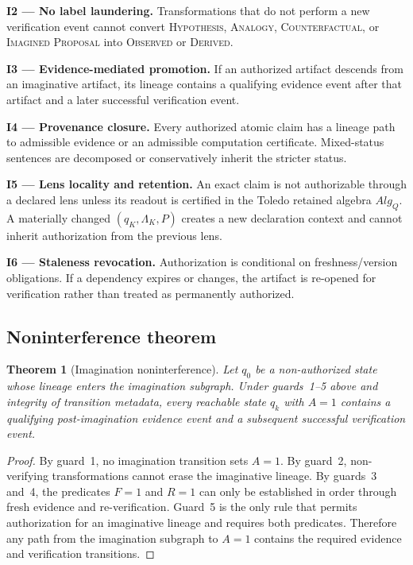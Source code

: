 \documentclass[10pt,twocolumn]{article}
\newtheorem{theorem}{Theorem}
\begin{document}
\textbf{I2 --- No label laundering.} Transformations that do not perform a new verification event cannot convert \textsc{Hypothesis}, \textsc{Analogy}, \textsc{Counterfactual}, or \textsc{Imagined Proposal} into \textsc{Observed} or \textsc{Derived}.

\textbf{I3 --- Evidence-mediated promotion.} If an authorized artifact descends from an imaginative artifact, its lineage contains a qualifying evidence event after that artifact and a later successful verification event.

\textbf{I4 --- Provenance closure.} Every authorized atomic claim has a lineage path to admissible evidence or an admissible computation certificate. Mixed-status sentences are decomposed or conservatively inherit the stricter status.

\textbf{I5 --- Lens locality and retention.} An exact claim is not authorizable through a declared lens unless its readout is certified in the Toledo retained algebra $Alg_Q$. A materially changed $(q_K,\Lambda_K,P)$ creates a new declaration context and cannot inherit authorization from the previous lens.

\textbf{I6 --- Staleness revocation.} Authorization is conditional on freshness/version obligations. If a dependency expires or changes, the artifact is re-opened for verification rather than treated as permanently authorized.

\subsection{Noninterference theorem}
\begin{theorem}[Imagination noninterference]
Let $q_0$ be a non-authorized state whose lineage enters the imagination subgraph. Under guards~1--5 above and integrity of transition metadata, every reachable state $q_k$ with $A=1$ contains a qualifying post-imagination evidence event and a subsequent successful verification event.
\end{theorem}
\begin{proof}
By guard~1, no imagination transition sets $A=1$. By guard~2, non-verifying transformations cannot erase the imaginative lineage. By guards~3 and~4, the predicates $F=1$ and $R=1$ can only be established in order through fresh evidence and re-verification. Guard~5 is the only rule that permits authorization for an imaginative lineage and requires both predicates. Therefore any path from the imagination subgraph to $A=1$ contains the required evidence and verification transitions.
\end{proof}
\end{document}
